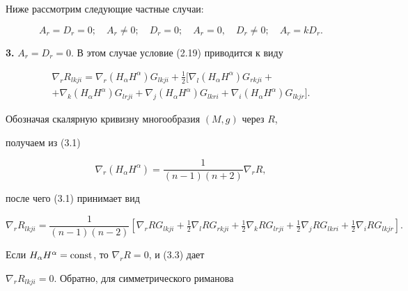 Ниже рассмотрим следующие частные случаи:


$$


A_r=D_r=0;\quad A_r\ne 0;\quad D_r=0;\quad


A_r=0,\quad D_r\ne 0;\quad A_r=k D_r.


$$





{\bf 3.} $A_r=D_r=0$. В этом случае условие (2.19) приводится к виду


\begin{multline}


\nabla_r R_{lkji}=\nabla_r(H_\alpha H^\alpha)


G_{lkji}+\frac{1}{2}[\nabla_l(H_\alpha H^\alpha)


G_{rkji}+ \\


%


+\nabla_k(H_\alpha H^\alpha)G_{lrji}+


\nabla_j(H_\alpha H^\alpha)G_{lkri}+\nabla_i


(H_\alpha H^\alpha)G_{lkjr}].\tag{3.1}


\end{multline}


Обозначая скалярную кривизну многообразия $(M,g)$ через $R$,


получаем из (3.1)


\begin{equation}


\nabla_r(H_\alpha H^\alpha)=\frac{1}{(n-1)(n+2)}\nabla_r


R,\tag{3.2}


\end{equation}


после чего (3.1) принимает вид


\begin{equation}


\nabla_r R_{lkji}=\frac{1}{(n-1)(n-2)}[\nabla_r R


G_{lkji}+\tfrac{1}{2}\nabla_l RG_{rkji}+


\tfrac{1}{2}\nabla_k RG_{lrji}+\tfrac{1}{2}


\nabla_j RG_{lkri}+\tfrac{1}{2}\nabla_i R


G_{lkjr}].\tag{3.3}


\end{equation}


Если $H_\alpha H^\alpha=\operatorname{const}$, то $\nabla_r R=0$, и (3.3) дает


$\nabla_r R_{lkji}=0$. Обратно, для симметрического риманова


